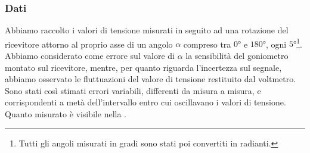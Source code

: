 \documentclass[a4paper]{article}
\begin{document}
\subsubsection{Dati}
Abbiamo raccolto i valori di tensione misurati in seguito ad una rotazione del ricevitore attorno al proprio asse di un angolo $\alpha$ compreso tra $\ang{0}$ e $\ang{180}$, ogni $\ang{5}$\footnote{Tutti gli angoli misurati in gradi sono stati poi convertiti in radianti.}. Abbiamo considerato come errore sul valore di $\alpha$ la sensibilità del goniometro montato sul ricevitore, mentre, per quanto riguarda l'incertezza sul segnale, abbiamo osservato le fluttuazioni del valore di tensione restituito dal voltmetro. Sono stati così stimati errori variabili, differenti da misura a misura, e corrispondenti a metà dell'intervallo entro cui oscillavano i valori di tensione.
Quanto misurato è visibile nella .
\end{document}

